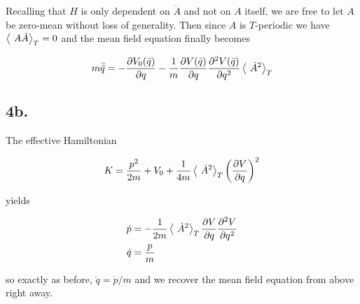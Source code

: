 \documentclass[12pt]{article}
\begin{document}
Recalling that \(H\) is only dependent on \( \ddot{A} \) and not on \(A\) itself, we are free to let \(A\) be zero-mean without loss of generality. Then since \(A\) is \(T\)-periodic we have \( \left\langle\ A\dot{A} \right\rangle_T = 0\) and the mean field equation finally becomes

\[ m\ddot{\bar{q}} = -\frac{\partial V_0(\bar{q})}{\partial q} - \frac{1}{m}\frac{\partial V(\bar{q})}{\partial q}\frac{\partial^2 V(\bar{q})}{\partial q^2}\left\langle\ \dot{A}^2 \right\rangle_T
\]

\subsection*{4b.}

The effective Hamiltonian 

\[K = \frac{p^2}{2m} + V_0 + \frac{1}{4m}\left\langle\ \dot{A}^2 \right\rangle_T\left( \frac{\partial V}{\partial q}\right)^2
\]

yields

\begin{align*}
\dot{p} &= -\frac{1}{2m}\left\langle\ \dot{A}^2 \right\rangle_T\frac{\partial V}{\partial q}\frac{\partial^2 V}{\partial q^2}\\
\dot{q} &= \frac{p}{m}
\end{align*}

so exactly as before, \(\ddot{q} = \dot{p}/m\) and we recover the mean field equation from above right away.
\end{document}
